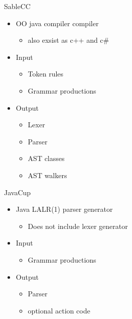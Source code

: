 \begin{frame}{SableCC}
  \begin{itemize}
    \item OO java compiler compiler
    \begin{itemize}
      \item also exsist as c++ and c\#
    \end{itemize}
    \item Input
    \begin{itemize}
      \item Token rules
      \item Grammar productions
    \end{itemize}
    \item Output
    \begin{itemize}
      \item Lexer
      \item Parser
      \item AST classes
      \item AST walkers
    \end{itemize}
  \end{itemize}
\end{frame}

\begin{frame}{JavaCup}
  \begin{itemize}
    \item Java LALR(1) parser generator
    \begin{itemize}
      \item Does not include lexer generator
    \end{itemize}
    \item Input
    \begin{itemize}
      \item Grammar productions
    \end{itemize}
    \item Output
    \begin{itemize}
      \item Parser
      \item optional action code
    \end{itemize}
  \end{itemize}
\end{frame}

